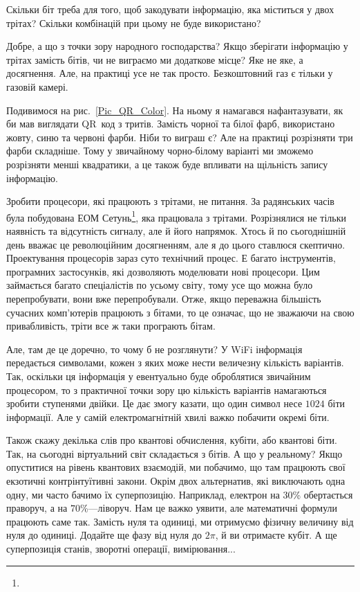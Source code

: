 \begin{exercise}
Скільки біт треба для того, щоб закодувати інформацію, яка міститься у двох трітах?
Скільки комбінацій при цьому не буде використано?
\end{exercise}

Добре, а що з точки зору народного господарства?
Якщо зберігати інформацію у трітах замість бітів, чи не виграємо ми додаткове місце?
Яке не яке, а досягнення.
Але, на практиці усе не так просто.
Безкоштовний газ є тільки у газовій камері.

Подивимося на рис.~\ref{Pic_QR_Color}.
На ньому я намагався нафантазувати, як би мав виглядати QR~код з тритів.
Замість чорної та білої фарб, використано жовту, синю та червоні фарби.
Ніби то виграш є?
Але на практиці розрізняти три фарби складніше.
Тому у звичайному чорно-білому варіанті ми зможемо розрізняти менші квадратики, а це також буде впливати на щільність запису інформацію.

Зробити процесори, які працюють з трітами, не питання.
За радянських часів була побудована ЕОМ Сетунь\footnote{\setunref}, яка працювала з трітами. 
Розрізнялися не тільки наявність та відсутність сигналу, але й його напрямок.
Хтось й по сьогоднішній день вважає це революційним досягненням, але я до цього ставлюся скептично.
Проектування процесорів зараз суто технічний процес.
Е багато інструментів, програмних застосунків, які дозволяють моделювати нові процесори.
Цим займається багато спеціалістів по усьому світу, тому усе що можна було перепробувати, вони вже перепробували.
Отже, якщо переважна більшість сучасних комп'ютерів працюють з бітами, то це означає, що не зважаючи на свою привабливість, тріти все ж таки програють бітам.

Але, там де це доречно, то чому б не розглянути?
У WiFi інформація передається символами, кожен з яких може нести величезну кількість варіантів.
Так, оскільки ця інформація у евентуально буде оброблятися звичайним процесором, то з практичної точки зору цю кількість варіантів намагаються зробити ступенями двійки.
Це дає змогу казати, що один символ несе $1024$ біти інформації.
Але у самій електромагнітній хвилі важко побачити окремі біти.

Також скажу декілька слів про квантові обчислення, кубіти, або квантові біти. 
Так, на сьогодні віртуальний світ складається з бітів. А що у реальному?
Якщо опуститися на рівень квантових взаємодій, ми побачимо, що там працюють свої екзотичні контрінтуїтивні закони.
Окрім двох альтернатив, які виключають одна одну, ми часто бачимо їх суперпозицію.
Наприклад, електрон на $30$\% обертається праворуч, а на $70$\%---ліворуч.
Нам це важко уявити, але математичні формули працюють саме так.
Замість нуля та одиниці, ми отримуємо фізичну величину від нуля до одиниці.
Додайте ще фазу від нуля до $2\pi$, й ви отримаєте кубіт.
А ще суперпозиція станів, зворотні операції, вимірювання...

